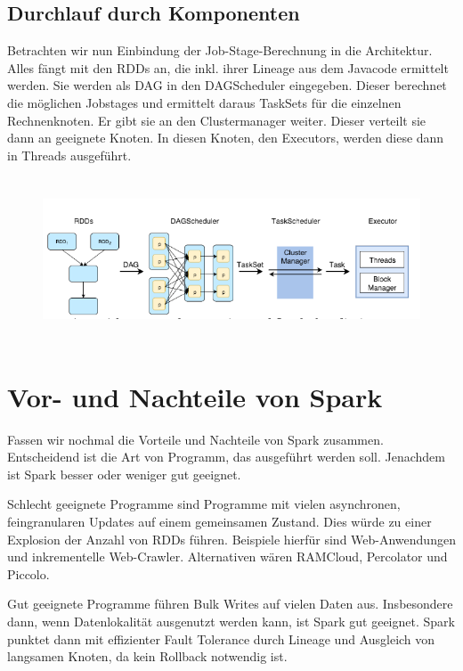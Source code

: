 \bigskip

\subsection[Durchlauf durch
Komponenten]{\rmfamily Durchlauf durch
Komponenten}
Betrachten wir nun Einbindung der Job-Stage-Berechnung in die
Architektur. Alles fängt mit den RDDs an, die inkl. ihrer Lineage aus
dem Javacode ermittelt werden. Sie werden als DAG in den DAGScheduler
eingegeben. Dieser berechnet die möglichen Jobstages und ermittelt
daraus TaskSets für die einzelnen Rechnenknoten. Er gibt sie an den
Clustermanager weiter. Dieser verteilt sie dann an geeignete Knoten. In
diesen Knoten, den Executors, werden diese dann in Threads ausgeführt. 

\begin{figure}
\centering
\includegraphics[width=15.24cm,height=4.856cm]{bilder/Seminartext-img3.png}
\end{figure}

\bigskip

\section[Vor{}- und Nachteile von
Spark]{\rmfamily Vor- und Nachteile von Spark}
Fassen wir nochmal die Vorteile und Nachteile von Spark zusammen.
Entscheidend ist die Art von Programm, das ausgeführt werden soll.
Jenachdem ist Spark besser oder weniger gut geeignet.

Schlecht geeignete Programme sind Programme mit vielen asynchronen,
feingranularen Updates auf einem gemeinsamen Zustand. Dies würde zu
einer Explosion der Anzahl von RDDs führen. Beispiele hierfür sind
Web-Anwendungen und inkrementelle Web-Crawler. Alternativen wären
RAMCloud, Percolator und Piccolo.

Gut geeignete Programme führen Bulk Writes auf vielen Daten aus.
Insbesondere dann, wenn Datenlokalität ausgenutzt werden kann, ist
Spark gut geeignet. Spark punktet dann mit effizienter Fault Tolerance
durch Lineage und Ausgleich von langsamen Knoten, da kein Rollback
notwendig ist.

